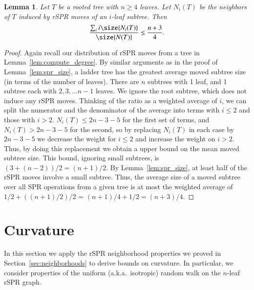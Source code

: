 \documentclass[]{elsarticle}
\newtheorem{lem}[thm]{Lemma}
\begin{document}
\begin{lem}
	Let $T$ be a rooted tree with $n \ge 4$ leaves.
	Let $N_i(T)$ be the neighbors of $T$ induced by rSPR moves of an $i$-leaf subtree.
	Then $$\frac{\sum_i i \size{N_i(T)}}{\size{N(T)}} \le \frac{n + 3}{4} .$$
	\label{lem:spr_size_mean}
\end{lem}
\begin{proof}
	Again recall our distribution of rSPR moves from a tree in Lemma~\ref{lem:compute_degree}.
	By similar arguments as in the proof of Lemma~\ref{lem:spr_size}, a ladder tree has the greatest average moved subtree size (in terms of the number of leaves).
	There are $n$ subtrees with 1 leaf, and 1 subtree each with $2,3, \ldots n - 1$ leaves.
	We ignore the root subtree, which does not induce any rSPR moves.
	Thinking of the ratio as a weighted average of $i$, we can split the numerator and the denominator of the average into terms with $i \leq 2$ and those with $i > 2$.
    $N_i(T) \leq 2n - 3 - 5$ for the first set of terms, and $N_i(T) > 2n - 3 - 5$ for the second, so by replacing $N_i(T)$ in each case by $2n-3-5$ we decrease the weight for $i \leq 2$ and increase the weight on $i > 2$.
	Thus, by doing this replacement we obtain a upper bound on the mean moved subtree size.
	This bound, ignoring small subtrees, is $(3 + (n-2)) / 2 = (n + 1) / 2$.
	By Lemma~\ref{lem:spr_size}, at least half of the rSPR moves involve a small subtree.
	Thus, the average size of a moved subtree over all SPR operations from a given tree is at most the weighted average of $1 / 2 + ((n + 1) / 2) / 2$ = $(n + 1) / 4 + 1 / 2 = (n + 3) / 4$.


\end{proof}


\section{Curvature}
\label{sec:curvature}
In this section we apply the rSPR neighborhood properties we proved in Section~\ref{sec:neighborhoods} to derive bounds on curvature.
In particular, we consider properties of the uniform (a.k.a.\ isotropic) random walk on the $n$-leaf rSPR graph.
\end{document}
